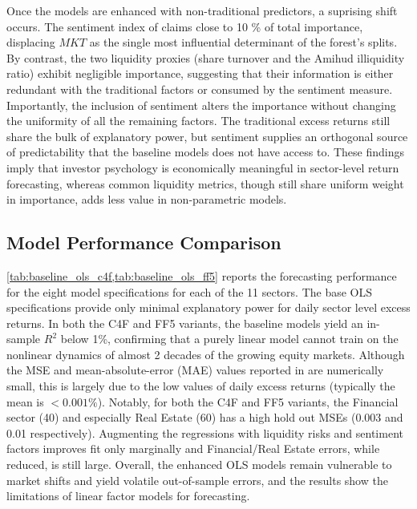Once the models are enhanced with non-traditional predictors, a suprising shift occurs. The sentiment index of  claims close to 10 \% of total importance, displacing $MKT$ as the single most influential determinant of the forest's splits. By contrast, the two liquidity proxies (share turnover and the Amihud illiquidity ratio) exhibit negligible importance, suggesting that their information is either redundant with the traditional factors or consumed by the sentiment measure. Importantly, the inclusion of sentiment alters the importance without changing the uniformity of all the remaining factors. The traditional excess returns still share the bulk of explanatory power, but sentiment supplies an orthogonal source of predictability that the baseline models does not have access to. These findings imply that investor psychology is economically meaningful in sector-level return forecasting, whereas common liquidity metrics, though still share uniform weight in importance, adds less value in non-parametric models.

 






\subsection{Model Performance Comparison}
\cref{tab:baseline_ols_c4f,tab:baseline_ols_ff5} reports the forecasting performance for the eight model specifications for each of the 11 sectors. The base OLS specifications provide only minimal explanatory power for daily sector level excess returns. In both the C4F and FF5 variants, the baseline models yield an in-sample $R^{2}$ below 1\%, confirming that a purely linear model cannot train on the nonlinear dynamics of almost 2 decades of the growing equity markets. Although the MSE and mean-absolute-error (MAE) values reported in  are numerically small, this is largely due to the low values of daily excess returns (typically the mean is  $<0.001\%$). Notably, for both the C4F and FF5 variants, the Financial sector (40) and especially Real Estate (60) has a high hold out MSEs (0.003 and 0.01 respectively). Augmenting the regressions with liquidity risks and sentiment factors  improves fit only marginally and Financial/Real Estate errors, while reduced, is still large. Overall, the enhanced OLS models remain vulnerable to market shifts and yield volatile out-of-sample errors, and the results show the limitations of linear factor models for forecasting.

